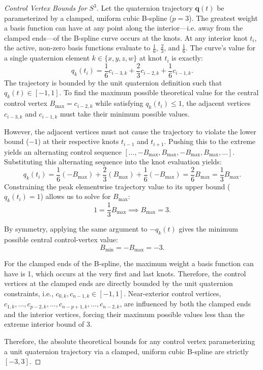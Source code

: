 \begin{proof}[Control Vertex Bounds for $S^3$]
    Let the quaternion trajectory $\mathbf{q}(t)$ be parameterized by a clamped, uniform cubic B-spline ($p=3$). 
    The greatest weight a basis function can have at any point along the interior---i.e. away from the clamped ends---of the B-spline curve occurs at the knots. 
    At any interior knot $t_i$, the active, non-zero basis functions evaluate to $\frac{1}{6}$, $\frac{2}{3}$, and $\frac{1}{6}$. 
    The curve's value for a single quaternion element $k \in \{x, y, z, w\}$ at knot $t_i$ is exactly:
    \begin{equation}
        q_k(t_i) = \frac{1}{6}c_{i-3, k} + \frac{2}{3}c_{i-2, k} + \frac{1}{6}c_{i-1, k}.
    \end{equation}
    The trajectory is bounded by the unit quaternion definition such that $q_k(t) \in [-1, 1]$. 
    To find the maximum possible theoretical value for the central control vertex $B_{\max} = c_{i-2,k}$ while satisfying $q_k(t_i) \le 1$, the adjacent vertices $c_{i-3, k}$ and $c_{i-1, k}$ must take their minimum possible values.
    
    However, the adjacent vertices must not cause the trajectory to violate the lower bound ($-1$) at their respective knots $t_{i-1}$ and $t_{i+1}$. 
    Pushing this to the extreme yields an alternating control sequence $[ \dots, -B_{\max}, B_{\max}, -B_{\max}, B_{\max}, \dots ]$. 
    Substituting this alternating sequence into the knot evaluation yields:
    \begin{equation}
        q_k(t_i) = \frac{1}{6}(-B_{\max}) + \frac{2}{3}(B_{\max}) + \frac{1}{6}(-B_{\max}) = \frac{2}{6}B_{\max} = \frac{1}{3}B_{\max}.
    \end{equation}
    Constraining the peak elementwise trajectory value to its upper bound ($q_k(t_i) = 1$) allows us to solve for $B_{\max}$:
    \begin{equation}
        1 = \frac{1}{3}B_{\max} \implies B_{\max} = 3.
    \end{equation}

    By symmetry, applying the same argument to $-q_k(t)$ gives the minimum
    possible central control-vertex value:
    \begin{equation}
        B_{\min} = -B_{\max} = -3.
    \end{equation}

    For the clamped ends of the B-spline, the maximum weight a basis function can have is 1, which occurs at the very first and last knots. 
    Therefore, the control vertices at the clamped ends are directly bounded by the unit quaternion constraints, i.e., $c_{0,k}, c_{n-1,k} \in [-1, 1]$.
    Near-exterior control vertices, ${c_{1,k}, \dots, c_{p-2,k}, \dots, c_{n-p+1,k}, \dots, c_{n-2,k}}$, are influenced by both the clamped ends and the interior vertices, forcing their maximum possible values less than the extreme interior bound of 3.
    
    Therefore, the absolute theoretical bounds for any control vertex parameterizing a unit quaternion trajectory via a clamped, uniform cubic B-spline are strictly $[-3, 3]$.
\end{proof}


